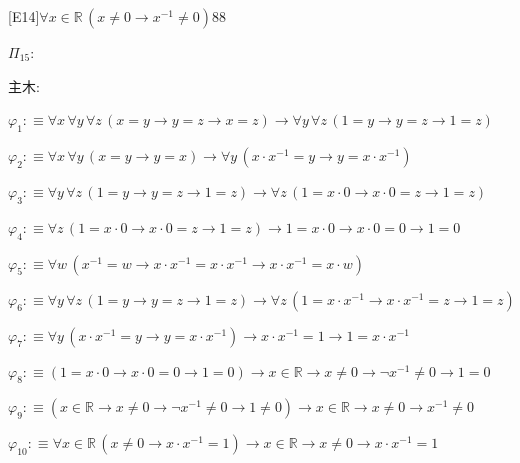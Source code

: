 \begin{fullproof}{[E14]}{$\forall x \in \mathbb{R}\,(x \neq 0 \to x^{-1} \neq 0)$}{88}
\begin{ptree}
\end{ptree}
\noindent$\Pi_{15}$:
\begin{ptree}
\noLine
{}
\noLine
{}
\end{ptree}
\noindent 主木:
\begin{ptree}
\noLine
{}
\noLine
{}
\end{ptree}
\begin{abbrevlist}
\item $\varphi_{1} :\equiv \forall x\,\forall y\,\forall z\,(x = y \to y = z \to x = z) \to \forall y\,\forall z\,(1 = y \to y = z \to 1 = z)$
\item $\varphi_{2} :\equiv \forall x\,\forall y\,(x = y \to y = x) \to \forall y\,(x \cdot x^{-1} = y \to y = x \cdot x^{-1})$
\item $\varphi_{3} :\equiv \forall y\,\forall z\,(1 = y \to y = z \to 1 = z) \to \forall z\,(1 = x \cdot 0 \to x \cdot 0 = z \to 1 = z)$
\item $\varphi_{4} :\equiv \forall z\,(1 = x \cdot 0 \to x \cdot 0 = z \to 1 = z) \to 1 = x \cdot 0 \to x \cdot 0 = 0 \to 1 = 0$
\item $\varphi_{5} :\equiv \forall w\,(x^{-1} = w \to x \cdot x^{-1} = x \cdot x^{-1} \to x \cdot x^{-1} = x \cdot w)$
\item $\varphi_{6} :\equiv \forall y\,\forall z\,(1 = y \to y = z \to 1 = z) \to \forall z\,(1 = x \cdot x^{-1} \to x \cdot x^{-1} = z \to 1 = z)$
\item $\varphi_{7} :\equiv \forall y\,(x \cdot x^{-1} = y \to y = x \cdot x^{-1}) \to x \cdot x^{-1} = 1 \to 1 = x \cdot x^{-1}$
\item $\varphi_{8} :\equiv (1 = x \cdot 0 \to x \cdot 0 = 0 \to 1 = 0) \to x \in \mathbb{R} \to x \neq 0 \to \neg x^{-1} \neq 0 \to 1 = 0$
\item $\varphi_{9} :\equiv (x \in \mathbb{R} \to x \neq 0 \to \neg x^{-1} \neq 0 \to 1 \neq 0) \to x \in \mathbb{R} \to x \neq 0 \to x^{-1} \neq 0$
\item $\varphi_{10} :\equiv \forall x \in \mathbb{R}\,(x \neq 0 \to x \cdot x^{-1} = 1) \to x \in \mathbb{R} \to x \neq 0 \to x \cdot x^{-1} = 1$

\end{abbrevlist}
\end{fullproof}
